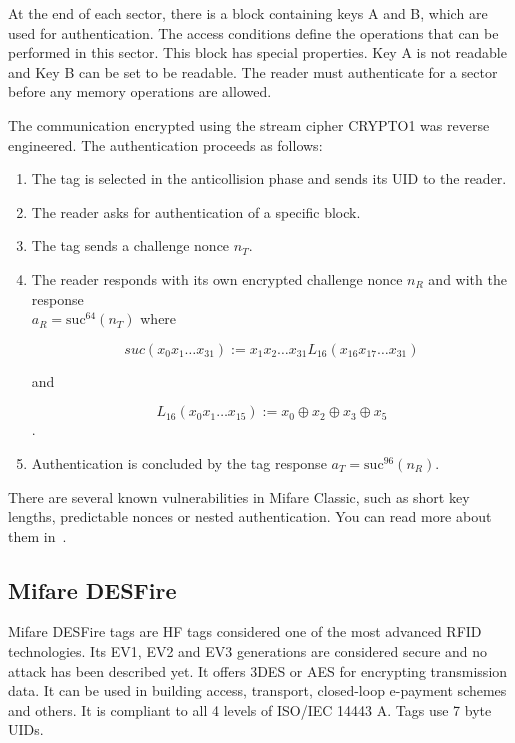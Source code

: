 At the end of each sector, there is a block containing keys A and B, which are used for authentication. The access conditions define the operations that can be performed in this sector. This block has special properties. Key A is not readable and Key B can be set to be readable. The reader must authenticate for a sector before any memory operations are allowed.~\cite{gans2008practical}

The communication encrypted using the stream cipher CRYPTO1 was reverse engineered. The authentication proceeds as follows:

\begin{enumerate}
    \item The tag is selected in the anticollision phase and sends its UID to the reader.
    \item The reader asks for authentication of a specific block.
    \item The tag sends a challenge nonce \( n_{T} \).
    \item The reader responds with its own encrypted challenge nonce \( n_{R} \) and with the response\\
    \(
        a_{R} = \text{suc}^{64}(n_{T})
    \) where

    \begin{equation*}
        suc(x_0 x_1 \ldots x_{31}) := x_1 x_2 \ldots x_{31} L_{16}(x_{16} x_{17} \ldots x_{31})
    \end{equation*}


    and

    \begin{equation*}
        L_{16}(x_0x_1 \ldots x_{15}) := x_0 \oplus x_2 \oplus x_3 \oplus x_5
    \end{equation*}.


\item Authentication is concluded by the tag response \( a_{T} = \text{suc}^{96}(n_{R}) \).~\cite{tezcan2017brute}
\end{enumerate}

 There are several known vulnerabilities in Mifare Classic, such as short key lengths, predictable nonces or nested authentication. You can read more about them in~\cite{meijer2015mifare}.


\subsection{Mifare DESFire}

Mifare DESFire tags are HF tags considered one of the most advanced RFID technologies. Its EV1, EV2 and EV3 generations are considered secure and no attack has been described yet. It offers 3DES or AES for encrypting transmission data. It can be used in building access, transport, closed-loop e-payment schemes and others. It is compliant to all 4 levels of ISO/IEC 14443 A. Tags use 7 byte UIDs.~\cite{desfiredatasheet, preucil2023surveying}

